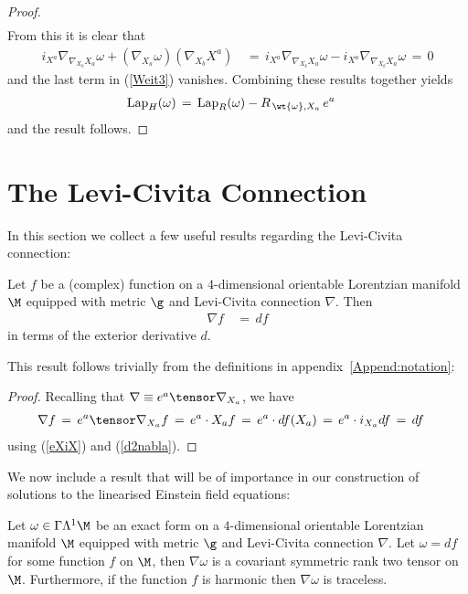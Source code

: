 \documentclass[sections]{tjwNOTES}
\newcommand{\LapH}{\text{Lap}_{H}}
\newcommand{\LapR}{\text{Lap}_{R}}
\begin{document}
\begin{proof}
\begin{align*}
	\end{align*}
	From this it is clear that 
	\begin{align*}
		i_{X^{a}}\nabla_{\nabla_{X_{b}}X_{a}}\omega + (\nabla_{X_{a}}\omega)(\nabla_{X_{b}}X^{a}) &\,=\, i_{X^{a}}\nabla_{\nabla_{X_{b}}X_{a}}\omega-i_{X^{a}}\nabla_{\nabla_{X_{b}}X_{a}}\omega \,=\, 0
	\end{align*}
	and the last term in (\ref{Weit3}) vanishes. Combining these results together yields
	\begin{align*}
		\LapH(\omega) &\,=\, \LapR(\omega) - R_{\,\wt{\omega},X_{a}}\,e^{a}
	\end{align*}
	and the result follows. 
\end{proof}


\section{The Levi-Civita Connection}
In this section we collect a few useful results regarding the Levi-Civita connection:

\begin{prop*}{}
	Let $f$ be a (complex) function on a $4$-dimensional orientable Lorentzian manifold $\M$ equipped with metric $\g$ and Levi-Civita connection $\nabla$. Then
	\begin{align}\label{nabfdf}
		\nabla f &\,=\, df
	\end{align}
	in terms of the exterior derivative $d$.
\end{prop*}

This result follows trivially from the definitions in appendix~\ref{Append:notation}:\\[0.2cm]

\begin{proof}
	Recalling that $\nabla\equiv e^{a}\tensor \nabla_{X_{a}}$, we have
	\begin{align*}
		\nabla f &\,=\, e^{a} \tensor \nabla_{X_{a}}f \,=\, e^{a} \cdot X_{a}f \,=\, e^{a} \cdot df(X_{a}) \,=\, e^{a} \cdot i_{X_{a}}df \,=\, df
	\end{align*}
	using (\ref{eXiX}) and (\ref{d2nabla}). 
\end{proof}

We now include a result that will be of importance in our construction of solutions to the linearised Einstein field equations:\\

\begin{prop*}{}
	Let $\omega\in\Gamma\Lambda^{1}\M$ be an exact form on a $4$-dimensional orientable Lorentzian manifold $\M$ equipped with metric $\g$ and Levi-Civita connection $\nabla$. Let $\omega=df$ for some function $f$ on $\M$, then $\nabla\omega$ is a covariant symmetric rank two tensor on $\M$. Furthermore, if the function $f$ is harmonic then $\nabla\omega$ is traceless. 
\end{prop*}
\end{document}
